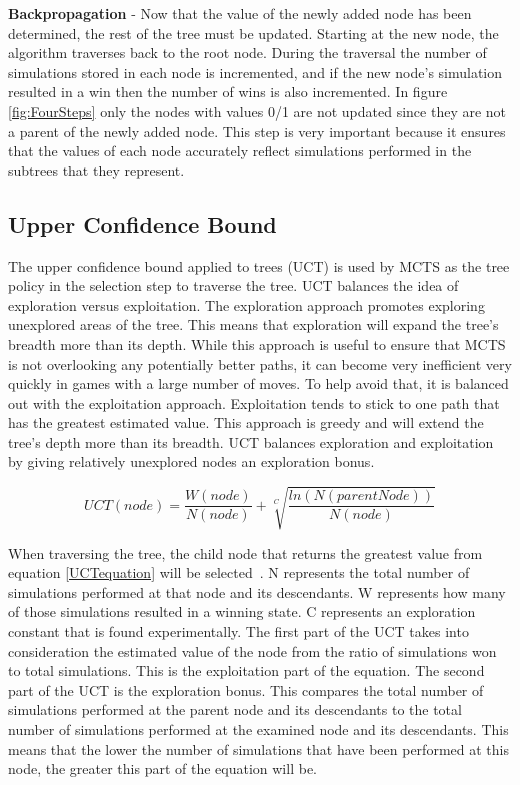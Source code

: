 \documentclass{sig-alternate}
\begin{document}
\textbf{Backpropagation} - Now that the value of the newly added node has been determined, the rest of the tree must be updated. Starting at the new node, the algorithm traverses back to the root node. During the traversal the number of simulations stored in each node is incremented, and if the new node's simulation resulted in a win then the number of wins is also incremented. In figure \ref{fig:FourSteps} only the nodes with values 0/1 are not updated since they are not a parent of the newly added node. This step is very important because it ensures that the values of each node accurately reflect simulations performed in the subtrees that they represent.

\subsection{Upper Confidence Bound}

The upper confidence bound applied to trees (UCT) is used by MCTS as the tree policy in the selection step to traverse the tree. UCT balances the idea of exploration versus exploitation. The exploration approach promotes exploring unexplored areas of the tree. This means that exploration will expand the tree's breadth more than its depth. While this approach is useful to ensure that MCTS is not overlooking any potentially better paths, it can become very inefficient very quickly in games with a large number of moves. To help avoid that, it is balanced out with the exploitation approach. Exploitation tends to stick to one path that has the greatest estimated value. This approach is greedy and will extend the tree's depth more than its breadth. UCT balances exploration and exploitation by giving relatively unexplored nodes an exploration bonus.  

 \begin{equation}
 \label{UCTequation}
 UCT(node) = \frac{W(node)}{N(node)} + \sqrt[C]{\frac{ln(N(parentNode))}{N(node)}}
 \end{equation}

When traversing the tree, the child node that returns the greatest value from equation \ref{UCTequation} will be selected~\cite{ActionSelection}. N represents the total number of simulations performed at that node and its descendants. W represents how many of those simulations resulted in a winning state. C represents an exploration constant that is found experimentally. The first part of the UCT takes into consideration the estimated value of the node from the ratio of simulations won to total simulations. This is the exploitation part of the equation. The second part of the UCT is the exploration bonus. This compares the total number of simulations performed at the parent node and its descendants to the total number of simulations performed at the examined node and its descendants. This means that the lower the number of simulations that have been performed at this node, the greater this part of the equation will be. 
\end{document}
